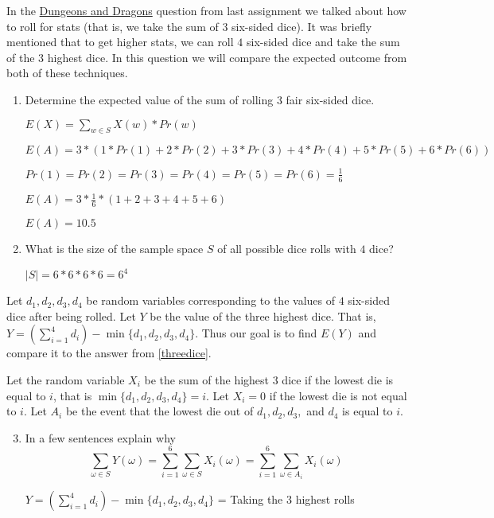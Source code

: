 \documentclass[12pt]{article}
\newcounter{ques}
\newenvironment{question}{\stepcounter{ques}{\noindent\bf Question \arabic{ques}:}}{\vspace{5mm}}
\begin{document}
\begin{question}
	In the \href{https://dnd.wizards.com/}{Dungeons and Dragons} question from last assignment we talked about how to roll for stats (that is, we take the sum of $3$ six-sided dice). It was briefly mentioned that to get higher stats, we can roll $4$ six-sided dice and take the sum of the $3$ highest dice. In this question we will compare the expected outcome from both of these techniques.
	\begin{enumerate}
		\item\label{threedice} Determine the expected value of the sum of rolling $3$ fair six-sided dice.
		
		$E(X) = \sum_{w \in S} X(w) * Pr(w)$

		$E(A) = 3 * (1 * Pr(1) + 2 * Pr(2) + 3 * Pr(3) + 4 * Pr(4) + 5 * Pr(5) + 6 * Pr(6))$
	
		$Pr(1) = Pr(2) = Pr(3) = Pr(4) = Pr(5) = Pr(6) = \frac{1}{6}$

		$E(A) = 3 * \frac{1}{6} * (1 + 2 + 3 + 4 + 5 + 6)$

		$E(A) = 10.5$
	

		\item What is the size of the sample space $S$ of all possible dice rolls with $4$ dice?
	
		$|S| = 6 * 6 * 6 * 6 = 6^4$
	
	\end{enumerate}

		Let $d_1,d_2,d_3,d_4$ be random variables corresponding to the values of $4$ six-sided dice after being rolled. Let $Y$ be the value of the three highest dice. That is, $Y =\left(\sum_{i=1}^4 d_i \right)- \min\{d_1,d_2,d_3,d_4\}$. Thus our goal is to find $E(Y)$ and compare it to the answer from \ref{threedice}.
		
		Let the random variable $X_i$ be the sum of the highest $3$ dice if the lowest die is equal to $i$, that is $\min\{d_1,d_2,d_3,d_4\}=i$.  Let $X_i =0$ if the lowest die is not equal to $i$.  Let $A_i$ be the event that the lowest die out of $d_1,d_2,d_3,$ and $d_4$ is equal to $i$. 
	\begin{enumerate}\setcounter{enumi}{2}	
		\item In a few sentences explain why $$\sum_{\omega \in S} Y(\omega)= \sum_{i=1}^6 \sum_{\omega \in S} X_i(\omega) = \sum_{i=1}^6 \sum_{\omega \in A_i} X_i(\omega)$$
		
		$Y =\left(\sum_{i=1}^4 d_i \right)- \min\{d_1,d_2,d_3,d_4\}$ = Taking the 3 highest rolls


\end{enumerate}
\end{question}
\end{document}
